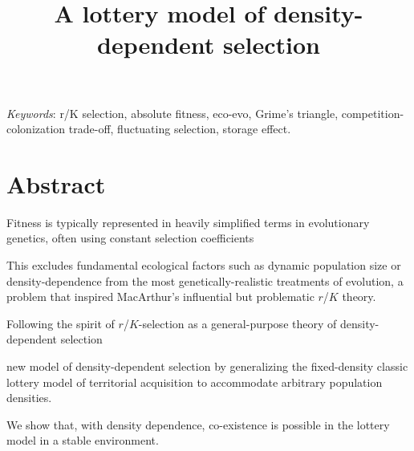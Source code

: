 \documentclass[11pt]{article}
\title{A lottery model of density-dependent selection}
\date{}
\begin{document}
\maketitle




\bigskip


\bigskip

\textit{Keywords}: r/K selection, absolute fitness, eco-evo, Grime's triangle, competition-colonization trade-off, fluctuating selection, storage effect.

\bigskip


\bigskip


\linenumbers{}
\modulolinenumbers[1]

\newpage{}

\section*{Abstract}

Fitness is typically represented in heavily simplified terms in evolutionary genetics, often using constant selection coefficients

This excludes fundamental ecological factors such as dynamic population size or density-dependence from the most genetically-realistic treatments of evolution, a problem that inspired MacArthur's influential but problematic $r$/$K$ theory. 

Following the spirit of $r$/$K$-selection as a general-purpose theory of density-dependent selection

new model of density-dependent selection by generalizing the fixed-density classic lottery model of territorial acquisition to accommodate arbitrary population densities. 

We show that, with density dependence, co-existence is possible in the lottery model in a stable environment. 
\end{document}
